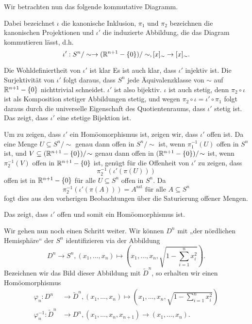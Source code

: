 \documentclass[a4paper,10pt]{article}
\begin{document}
Wir betrachten nun das folgende kommutative Diagramm.
\begin{center}
\end{center}
Dabei bezeichnet $\iota$ die kanonische Inklusion, $\pi_1$ und $\pi_2$ bezeichnen die kanonischen Projektionen und $\iota'$ die induzierte Abbildung, die das Diagram kommutieren lässt, d.h.
\[
 \iota' : S^n / \sim \to (\mathbb{R}^{n+1}-\{0\})/\sim, [x]_\sim \to [x]_\sim.
\]

Die Wohldefiniertheit von $\iota'$ ist klar Es ist auch klar, dass $\iota'$ injektiv ist. Die Surjektivität von $\iota'$ folgt daraus, dass $S^n$ jede Äquivalenzklasse von $\sim$ auf $\mathbb{R}^{n+1}-\{0\}$ nichttrivial schneidet. $\iota'$ ist also bijektiv. $\iota$ ist auch stetig, denn $\pi_2 \circ \iota$ ist als Komposition stetiger Abbildungen stetig, und wegen $\pi_2 \circ \iota = \iota' \circ \pi_1$ folgt daraus durch die universelle Eigenschaft des Quotientenraums, dass $\iota'$ stetig ist. Das zeigt, dass $\iota'$ eine stetige Bijektion ist.

Um zu zeigen, dass $\iota'$ ein Homöomorphismus ist, zeigen wir, dass $\iota'$ offen ist. Da eine Menge $U \subseteq S^n/\!\sim$ genau dann offen in $S^n/\!\sim$ ist, wenn $\pi_1^{-1}(U)$ offen in $S^n$ ist, und $V \subseteq (\mathbb{R}^{n+1} - \{0\})/\!\sim$ genau dann offen in $(\mathbb{R}^{n+1}-\{0\})/\!\sim$ ist, wenn $\pi_2^{-1}(V)$ offen in $\mathbb{R}^{n+1} - \{0\}$ ist, genügt für die Offenheit von $\iota'$ zu zeigen, dass
\[
 \pi_2^{-1}(\iota'(\pi(U)))
\]
offen ist in $\mathbb{R}^{n+1} - \{0\}$ für alle $U \subseteq S^n$ offen in $S^n$. Da
\[
 \pi_2^{-1}(\iota'(\pi(A))) = A^{\text{sat}} \text{ für alle } A \subseteq S^n
\]
fogt dies aus den vorherigen Beobachtungen über die Saturierung offener Mengen.

Das zeigt, dass $\iota'$ offen und somit ein Homöomorphismus ist.

Wir gehen nun noch einen Schritt weiter. Wir können $D^n$ mit „der nördlichen Hemisphäre“ der $S^n$ identifizieren via der Abbildung
\[
 D^n \to S^n, (x_1, \ldots, x_n) \mapsto \left(x_1, \ldots, x_n, \sqrt{1-\sum_{i=1}^n x_i^2}\right).
\]
Bezeichnen wir das Bild dieser Abbildung mit $\tilde{D}^n$, so erhalten wir einen Homöomorphismus
\begin{align*}
 \varphi_n : D^n &\to \tilde{D}^n, (x_1, \ldots, x_n) \mapsto \left(x_1, \ldots, x_n, \sqrt{1-\sum_{i=1}^n x_i^2}\right) \\
 \varphi_n^{-1} : \tilde{D}^n &\to D^n, (x_1, \ldots, x_n, x_{n+1}) \to (x_1, \ldots, x_n).
\end{align*}
\end{document}

